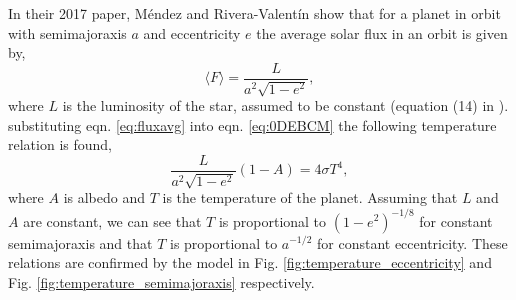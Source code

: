 \documentclass[12pt, onecolumn]{revtex4-2}    %
\begin{document}

In their 2017 paper, Méndez and Rivera-Valentín \cite{Mendez2017} show that for a planet in orbit with semimajoraxis $a$ and eccentricity $e$ the average solar flux in an orbit is given by,
\begin{equation} \label{eq:fluxavg}
    \langle F\rangle = \frac{L}{a^2 \sqrt{1-e^2}},
\end{equation}
where $L$ is the luminosity of the star, assumed to be constant (equation (14) in \cite{Mendez2017}).
substituting eqn. \eqref{eq:fluxavg} into eqn. \eqref{eq:0DEBCM} the following temperature relation is found,
\begin{equation}
    \frac{L}{a^2 \sqrt{1-e^2}} (1-A) = 4 \sigma T^4,
    \label{eq:Temp_eccent}
\end{equation}
where $A$ is albedo and $T$ is the temperature of the planet.
Assuming that $L$ and $A$ are constant, we can see that $T$ is proportional to $(1-e^2)^{-1/8}$ for constant semimajoraxis and that $T$ is proportional to $a^{-1/2}$ for constant eccentricity.
These relations are confirmed by the model in Fig. \ref{fig:temperature_eccentricity} and Fig. \ref{fig:temperature_semimajoraxis} respectively.
\end{document}
